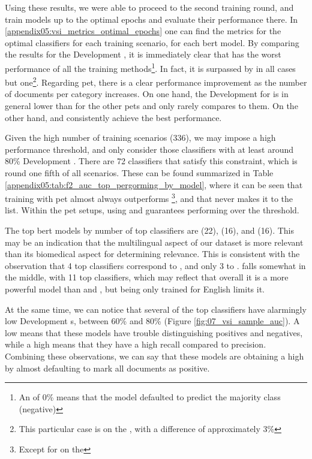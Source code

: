 Using these results, we were able to proceed to the second training round, and train models up to the optimal epochs and evaluate their performance there. In \appendixname{} \ref{appendix05:vsi_metrics_optimal_epochs} one can find the metrics for the optimal classifiers for each training scenario, for each \gls{bert} model. By comparing the results for the Development \fTwo{}, it is immediately clear that \unbalanced{} has the worst performance of all the training methods\footnote{An \fTwo{} of 0\% means that the model defaulted to predict the majority class (negative)}. In fact, it is surpassed by \balanced{} in all cases but one\footnote{This particular case is \bertbase{} on the \trafilaturaTitle{}, with a difference of approximately 3\%}. 
Regarding \gls{pet}, there is a clear performance improvement as the number of documents per category increases. On one hand, the Development \fTwo{} for \petFifty{} is in general lower than for the other \gls{pet}s and only rarely compares to them. On the other hand, \petFiveHundred{} and \petThousand{} consistently achieve the best performance.

Given the high number of training scenarios ($336$), we may impose a high performance threshold, and only consider those classifiers with at least around 80\% Development \fTwo{}. There are 72 classifiers that satisfy this constraint, which is round one fifth of  all scenarios. These can be found summarized in Table \ref{appendix05:tab:f2_auc_top_pergorming_by_model}, where it can be seen that training with \gls{pet} almost always outperforms \finetuning{}\footnote{Except for \bertxlmroberta{} on the \trafilaturaFulltext{}}, and that \unbalanced{} never makes it to the list. Within the \gls{pet} setups, using \petFiveHundred{} and \petThousand{} guarantees performing over the threshold. 

The top \gls{bert} models by number of top classifiers are \bertxlmroberta{} (22), \bertmultilingual{} (16), and \bertbiolinkbert{} (16). This may be an indication that the multilingual aspect of our dataset is more relevant than its biomedical aspect for determining relevance. This is consistent with the observation that 4 top classifiers correspond to \bertscibert{}, and only 3 to \bertbase{}. \bertroberta{} falls somewhat in the middle, with 11 top classifiers, which may reflect that overall it is a more powerful model than \bertbase{} and \bertscibert{}, but being only trained for English limits it.


At the same time, we can notice that several of the top classifiers have alarmingly low Development \auc{}s, between 60\% and 80\% (Figure \ref{fig:07_vsi_sample_auc}). A low \auc{} means that these models have trouble distinguishing positives and negatives, while a high \fTwo{} means that they have a high recall compared to precision. Combining these observations, we can say that these models are obtaining a high \fTwo{} by almost defaulting to mark all documents as positive.




